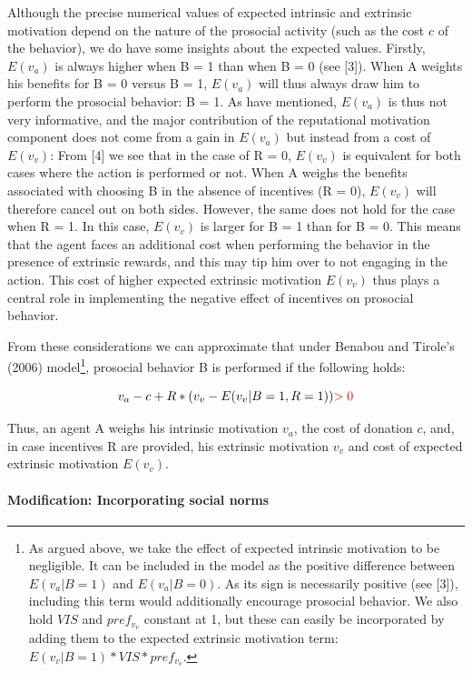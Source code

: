 \documentclass[AER]{AEA}
\begin{document}
Although the precise numerical values of expected intrinsic and extrinsic motivation depend on the nature of the prosocial activity (such as the cost $c$ of the behavior), we do have some insights about the expected values. Firstly, $E(v_{a})$ is always higher when B = 1 than when B = 0 (see [3]). When A weights his benefits for B = 0 versus B = 1, $E(v_{a})$ will thus always draw him to perform the prosocial behavior: B = 1. As \cite{benabou_incentives_2006} have mentioned, $E(v_{a})$ is thus not very informative, and the major contribution of the reputational motivation component does not come from a gain in $E(v_{a})$ but instead from a cost of $E(v_{v})$: From [4] we see that in the case of R = 0, $E(v_{v})$ is equivalent for both cases where the action is performed or not. When A weighs the benefits associated with choosing B in the absence of incentives (R = 0), $E(v_{v})$ will therefore cancel out on both sides. However, the same does not hold for the case when R = 1. In this case, $E(v_{v})$ is larger for B = 1 than for B = 0. This means that the agent faces an additional cost when performing the behavior in the presence of extrinsic rewards, and this may tip him over to not engaging in the action. This cost of higher expected extrinsic motivation $E(v_{v})$ thus plays a central role in implementing the negative effect of incentives on prosocial behavior.

From these considerations we can approximate that under Benabou and Tirole’s (2006) model\footnote{As argued above, we take the effect of expected intrinsic motivation to be negligible. It can be included in the model as the positive difference between $E(v_{a} | B = 1)$ and $E(v_{a} | B = 0)$. As its sign is necessarily positive (see [3]), including this term would additionally encourage prosocial behavior. We also hold $VIS$ and $pref_{v_{v}}$ constant at 1, but these can easily be incorporated by adding them to the expected extrinsic motivation term: $E(v_{v} | B = 1) * VIS * pref_{v_{v}}$.}, prosocial behavior B is performed if the following holds:

	$$v_{a} - c + R * (v_{v}  -  E(v_{v} | B = 1, R = 1) )  \mathbin{\color{red}> 0}$$

Thus, an agent A weighs his intrinsic motivation $v_{a}$, the cost of donation $c$, and, in case incentives R are provided, his extrinsic motivation $v_{v}$ and cost of expected extrinsic motivation $E(v_{v})$.

\paragraph{Modification: Incorporating social norms}
	
\end{document}
